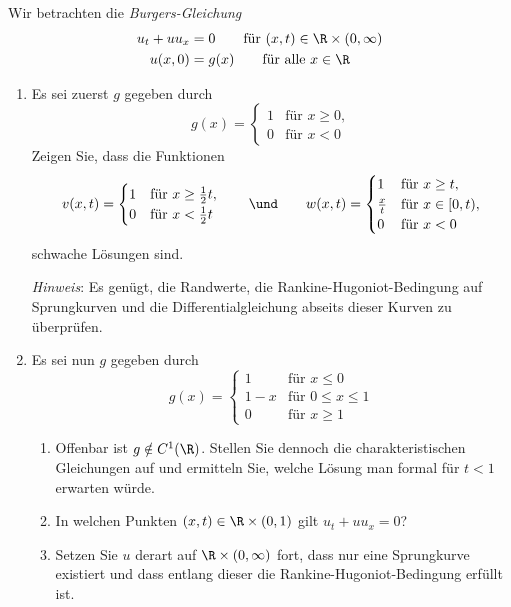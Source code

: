\begin{exercisePage}
\begin{task}
	Wir betrachten die \textit{Burgers-Gleichung}
	\begin{equation*}
	\begin{aligned}
	u_t + uu_x &= 0 \qquad \text{für } (x,t) \in \R \times (0,\infty)\\
	u(x,0) &= g(x) \qquad\text{für alle } x \in \R
	\end{aligned}
	\end{equation*}
	\begin{enumerate}
		\item Es sei zuerst $g$ gegeben durch
		\begin{equation*}
			g(x) = \begin{cases} 1 &\text{für } x \geq 0,\\ 0 & \text{für } x < 0 \end{cases}
		\end{equation*}
		Zeigen Sie, dass die Funktionen
		\begin{equation*}
			v(x,t) = \begin{cases} 1 & \text{für } x \geq \tfrac12 t,\\ 0 &\text{für }x < \tfrac12t \end{cases}
			\qquad \und \qquad
			w(x,t) = \begin{cases} 1 & \text{für } x \geq t,\\ \frac{x}{t} & \text{für } x\in [0,t),\\ 0 & \text{für } x < 0 \end{cases}
		\end{equation*}
		schwache Lösungen sind.
		
		\textit{Hinweis}: Es genügt, die Randwerte, die Rankine-Hugoniot-Bedingung auf Sprungkurven und die Differentialgleichung abseits dieser Kurven zu überprüfen.
		
		\item Es sei nun $g$ gegeben durch
		\begin{equation*}
			g(x) = \begin{cases} 1 & \text{für } x\leq 0 \\ 1-x & \text{für } 0 \leq x \leq 1 \\ 0 & \text{für } x \geq 1 \end{cases}
		\end{equation*}
		\begin{enumerate}
			\item Offenbar ist $g \notin C^1(\R)$. Stellen Sie dennoch die charakteristischen Gleichungen auf und ermitteln Sie, welche Lösung man formal für $t<1$ erwarten würde.
			\item In welchen Punkten $(x,t)\in \R \times (0,1)$ gilt $u_t + u u_x = 0$?
			\item Setzen Sie $u$ derart auf $\R \times (0,\infty)$ fort, dass nur eine Sprungkurve existiert und dass entlang dieser die Rankine-Hugoniot-Bedingung erfüllt ist.
			

\end{enumerate}
\end{enumerate}
\end{task}
\end{exercisePage}
